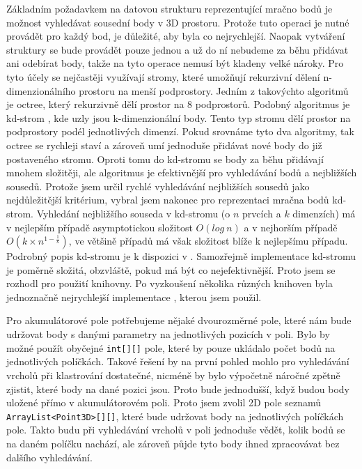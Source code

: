 \documentclass[11pt,twoside,a4paper]{book}
\begin{document}
Základním požadavkem na datovou strukturu reprezentující mračno bodů je možnost vyhledávat sousední body v 3D prostoru. Protože tuto operaci je nutné provádět pro každý bod, je důležité, aby byla co nejrychlejší. Naopak vytváření struktury se bude provádět pouze jednou a už do ní nebudeme za běhu přidávat ani odebírat body, takže na tyto operace nemusí být kladeny velké nároky. Pro tyto účely se nejčastěji využívají stromy, které umožňují rekurzivní dělení n-dimenzionálního prostoru na menší podprostory. Jedním z takovýchto algoritmů je octree, který rekurzivně dělí prostor na 8 podprostorů. Podobný algoritmus je kd-strom \cite{wiki:kdtree}, kde uzly jsou k-dimenzionální body. Tento typ stromu dělí prostor na podprostory podél jednotlivých dimenzí. Pokud srovnáme tyto dva algoritmy, tak octree se rychleji staví a zároveň umí jednoduše přidávat nové body do již postaveného stromu. Oproti tomu do kd-stromu se body za běhu přidávají mnohem složitěji, ale algoritmus je efektivnější pro vyhledávání bodů a nejbližších sousedů. Protože jsem určil rychlé vyhledávání nejbližších sousedů jako nejdůležitější kritérium, vybral jsem nakonec pro reprezentaci mračna bodů kd-strom. Vyhledání nejbližšího souseda v kd-stromu (o $n$ prvcích a $k$ dimenzích) má v nejlepším případě asymptotickou složitost $O(log~n)$ a v nejhorším případě $O(k \times n^{1-\frac{1}{k}})$, ve většině případů má však složitost blíže k nejlepšímu případu. Podrobný popis kd-stromu je k dispozici v \cite{wiki:kdtree}. Samozřejmě implementace kd-stromu je poměrně složitá, obzvláště, pokud má být co nejefektivnější. Proto jsem se rozhodl pro použití knihovny. Po vyzkoušení několika různých knihoven byla jednoznačně nejrychlejší implementace \cite{kdtree}, kterou jsem použil.

Pro akumulátorové pole potřebujeme nějaké dvourozměrné pole, které nám bude udržovat body  s danými parametry na jednotlivých pozicích v poli. Bylo by možné použít obyčejné \verb|int[][]| pole, které by pouze ukládalo počet bodů na jednotlivých políčkách. Takové řešení by na první pohled mohlo pro vyhledávání vrcholů při klastrování dostatečné, nicméně by bylo výpočetně náročné zpětně zjistit, které body na dané pozici jsou. Proto bude jednodušší, když budou body uložené přímo v akumulátorovém poli. Proto jsem zvolil 2D pole seznamů \verb|ArrayList<Point3D>[][]|, které bude udržovat body na jednotlivých políčkách pole. Takto budu při vyhledávání vrcholů v poli jednoduše vědět, kolik bodů se na daném políčku nachází, ale zároveň půjde tyto body ihned zpracovávat bez dalšího vyhledávání. 
\end{document}
